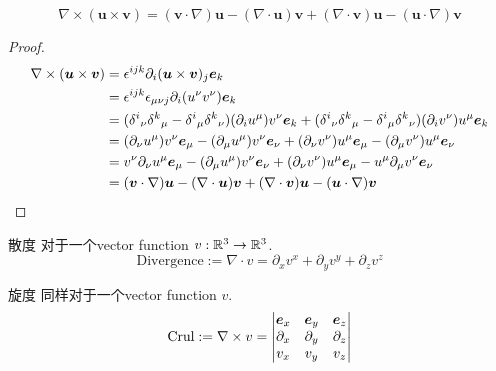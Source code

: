 \documentclass{mynote}
\begin{document}
\begin{proposition}
    \[
    \nabla \times (\bm{u} \times \bm{v}) =  (\bm{v} \cdot \nabla) \bm{u} - (\nabla \cdot \bm{u}) \bm{v} + (\nabla \cdot \bm{v}) \bm{u} - (\bm{u} \cdot \nabla )\bm{v}
    \]
\end{proposition}
\begin{proof}
    \begin{align*}
        \nabla \times (\boldsymbol{u} \times \boldsymbol{v}) &= \epsilon^{ijk} \partial_i (\boldsymbol{u} \times \boldsymbol{v})_j \boldsymbol{e}_k \\
        &= \epsilon^{ijk} \epsilon_{\mu \nu j} \partial_i (u^{\nu} v^{\nu}) \boldsymbol{e}_k \\
        &= ({\delta^i}_{\nu}{\delta^k}_{\mu} - {\delta^i}_{\mu}{\delta^k}_{\nu})(\partial_iu^{\mu}) v^{\nu} \boldsymbol{e}_k +  ({\delta^i}_{\nu}{\delta^k}_{\mu} - {\delta^i}_{\mu}{\delta^k}_{\nu}) (\partial_i v^{\nu})u^{\mu} \boldsymbol{e}_k \\
        &= (\partial_{\nu} u^{\mu}) v^{\nu} \boldsymbol{e}_{\mu} - (\partial_{\mu} u^{\mu}) v^{\nu} \boldsymbol{e}_{\nu} + (\partial_{\nu} v^{\nu}) u^{\mu} \boldsymbol{e}_{\mu} - (\partial_{\mu} v^{\nu}) u^{\mu} \boldsymbol{e}_{\nu} \\
        &= v^{\nu} \partial_{\nu} u^{\mu} \boldsymbol{e}_{\mu} - (\partial_{\mu} u^{\mu}) v^{\nu} \boldsymbol{e}_{\nu} + (\partial_{\nu}v^{\nu})u^{\mu}\boldsymbol{e}_{\mu} - u^{\mu}\partial_{\mu} v^{\nu} \boldsymbol{e}_{\nu} \\
        &= (\boldsymbol{v} \cdot \nabla) \boldsymbol{u} - (\nabla \cdot \boldsymbol{u}) \boldsymbol{v} + (\nabla \cdot \boldsymbol{v}) \boldsymbol{u} - (\boldsymbol{u} \cdot \nabla )\boldsymbol{v}
    \end{align*}
\end{proof}







\begin{define}{散度}
    对于一个vector function $v : \mathbb{R}^3 \to \mathbb{R}^3$.
    \[
        \textrm{Divergence} := \nabla \cdot v = \partial_x v^x + \partial_y v^y + \partial_z v^z
    \]
\end{define}


\begin{define}{旋度}
    同样对于一个vector function $v$.
    \[
    \textrm{Crul}:= \nabla \times v = 
    \left|
        \begin{matrix}
            \boldsymbol{e}_x & \boldsymbol{e}_y & \boldsymbol{e}_z \\
            \partial_x & \partial_y & \partial_z \\
            v_x & v_y & v_z
        \end{matrix}
    \right|
    \]
\end{define}
\end{document}

